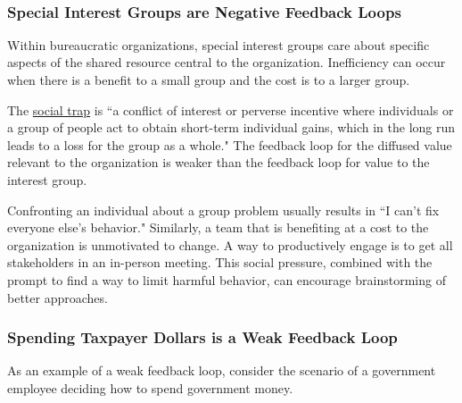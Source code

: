 
\ \\



\subsubsection*{Special Interest Groups are Negative Feedback Loops}

Within bureaucratic organizations, special interest groups care about specific aspects of the shared resource central to the organization. 
Inefficiency can occur when there is a benefit to a small group and the cost is to a larger group.

The \href{https://en.wikipedia.org/wiki/Social_trap}{social trap}
\iftoggle{WPinmargin}{\marginpar{$>$Wikipedia: social trap}}{ }%
is ``a conflict of interest or perverse incentive where individuals or a group of people act to obtain short-term individual gains, which in the long run leads to a loss for the group as a whole."
The feedback loop for the diffused value relevant to the organization is weaker than the feedback loop for value to the interest group. 

Confronting an individual about a group problem usually results in ``I can't fix everyone else's behavior." Similarly, a team that is benefiting at a cost to the organization is unmotivated to change. A way to productively engage is to get all stakeholders in an in-person meeting. This social pressure, combined with the prompt to find a way to limit harmful behavior, can encourage brainstorming of better approaches. 

\subsubsection*{Spending Taxpayer Dollars is a Weak Feedback Loop}

As an example of a weak feedback loop, consider the scenario of a government employee deciding how to spend government money.

